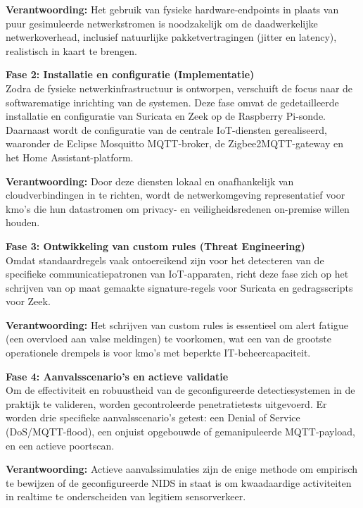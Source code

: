 \textbf{Verantwoording:} Het gebruik van fysieke hardware-endpoints in plaats van puur gesimuleerde netwerkstromen is noodzakelijk om de daadwerkelijke netwerkoverhead, inclusief natuurlijke pakketvertragingen (jitter en latency), realistisch in kaart te brengen.

\vspace{0.5cm}

\textbf{Fase 2: Installatie en configuratie (Implementatie)} \\
Zodra de fysieke netwerkinfrastructuur is ontworpen, verschuift de focus naar de softwarematige inrichting van de systemen. Deze fase omvat de gedetailleerde installatie en configuratie van Suricata en Zeek op de Raspberry Pi-sonde. Daarnaast wordt de configuratie van de centrale IoT-diensten gerealiseerd, waaronder de Eclipse Mosquitto MQTT-broker, de Zigbee2MQTT-gateway en het Home Assistant-platform.

\textbf{Verantwoording:} Door deze diensten lokaal en onafhankelijk van cloudverbindingen in te richten, wordt de netwerkomgeving representatief voor kmo's die hun datastromen om privacy- en veiligheidsredenen on-premise willen houden.

\vspace{0.5cm}

\textbf{Fase 3: Ontwikkeling van custom rules (Threat Engineering)} \\
Omdat standaardregels vaak ontoereikend zijn voor het detecteren van de specifieke communicatiepatronen van IoT-apparaten, richt deze fase zich op het schrijven van op maat gemaakte signature-regels voor Suricata en gedragsscripts voor Zeek.

\textbf{Verantwoording:} Het schrijven van custom rules is essentieel om alert fatigue (een overvloed aan valse meldingen) te voorkomen, wat een van de grootste operationele drempels is voor kmo's met beperkte IT-beheercapaciteit.

\vspace{0.5cm}

\textbf{Fase 4: Aanvalsscenario's en actieve validatie} \\
Om de effectiviteit en robuustheid van de geconfigureerde detectiesystemen in de praktijk te valideren, worden gecontroleerde penetratietests uitgevoerd. Er worden drie specifieke aanvalsscenario's getest: een Denial of Service (DoS/MQTT-flood), een onjuist opgebouwde of gemanipuleerde MQTT-payload, en een actieve poortscan.

\textbf{Verantwoording:} Actieve aanvalssimulaties zijn de enige methode om empirisch te bewijzen of de geconfigureerde NIDS in staat is om kwaadaardige activiteiten in realtime te onderscheiden van legitiem sensorverkeer.

